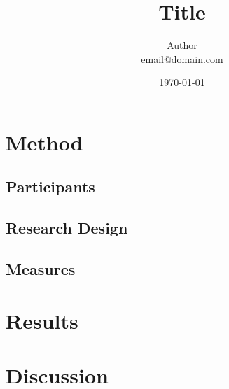 \documentclass[doc,fignum,babel,english,noapacite]{apa}	%
\title{Title}
\date{\today}
\author{Author \\
{email@domain.com}}
\affiliation{Affiliation}
\begin{document}
\ifpdf
\else
\fi

\maketitle

\section{Method}

\subsection{Participants}

\subsection{Research Design}

\subsection{Measures}

\section{Results}

\section{Discussion}

\appendix

\end{document}
